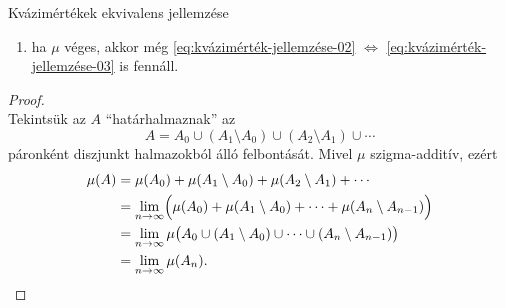 \documentclass[
]{elteikthesis}[2024/04/26]
\begin{document}
\begin{theorem}{Kvázimértékek ekvivalens jellemzése}{}
\begin{enumerate}
			\item ha \( \mu \) véges, akkor még 
			\ref{eq:kvázimérték-jellemzése-02} \( \Longleftrightarrow \)
			\ref{eq:kvázimérték-jellemzése-03} is fennáll.
		\end{enumerate}
	\end{theorem}
	\begin{proof} \,\\[6pt]
		
		\fbox{\ref{eq:kvázimérték-jellemzése-01} \( \Longrightarrow \)
			  \ref{eq:kvázimérték-jellemzése-02}}
		Tekintsük az \( A \) ``határhalmaznak'' az
		\[
			A = A_0 \cup (A_1 \setminus A_0) \cup (A_2 \setminus A_1) \cup \cdots
		\]
		páronként diszjunkt halmazokból álló felbontását.
		Mivel \( \mu \) szigma-additív, ezért
		\begin{align*}
			\mu(A)
			&= \mu(A_0) + \mu(A_1 \setminus A_0) + \mu(A_2 \setminus A_1) + \cdots \\
			&= \lim_{n \to \infty} \Bigl( 
			\mu(A_0) + \mu(A_1 \setminus A_0) + \cdots + \mu(A_n \setminus A_{n-1})
			\Bigr)\\
			&= \lim_{n \to \infty} \mu \bigl( 
			A_0 \cup (A_1 \setminus A_0) \cup \cdots \cup (A_n \setminus A_{n-1})
			\bigr) \\
			&= \lim_{n \to \infty} \mu (A_n).
		\end{align*}
	\end{proof}
	
	\newpage
	
\end{document}
